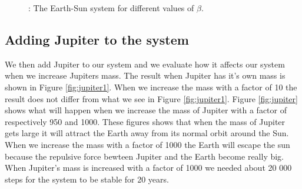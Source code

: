 \documentclass{article}
\begin{document}
\begin{figure}[H]
    \caption{: The Earth-Sun system for different values of $\beta$.}
    \label{fig:beta}
    \end{figure}

\subsection{Adding Jupiter to the system}
We then add Jupiter to our system and we evaluate how it affects our system when we increase Jupiters mass. The result when Jupiter has it's own mass is shown in Figure \ref{fig:jupiter1}. When we increase the mass with a factor of 10 the result does not differ from what we see in Figure \ref{fig:jupiter1}. Figure \ref{fig:jupiter} shows what will happen when we increase the mass of Jupiter with a factor of respectively 950 and 1000. These figures shows that when the mass of Jupiter gets large it will attract the Earth away from its normal orbit around the Sun. When we increase the mass with a factor of 1000 the Earth will escape the sun because the repulsive force bewteen Jupiter and the Earth become really big. When Jupiter's mass is increased with a factor of 1000 we needed about 20 000 steps for the system to be stable for 20 years.
\end{document}
